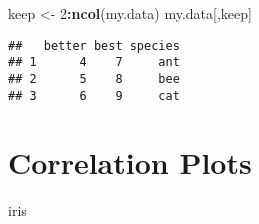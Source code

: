 \documentclass[]{book}
\newenvironment{Shaded}{\begin{snugshade}}{\end{snugshade}}
\newcommand{\DecValTok}[1]{\textcolor[rgb]{0.00,0.00,0.81}{#1}}
\newcommand{\KeywordTok}[1]{\textcolor[rgb]{0.13,0.29,0.53}{\textbf{#1}}}
\newcommand{\NormalTok}[1]{#1}
\newcommand{\OperatorTok}[1]{\textcolor[rgb]{0.81,0.36,0.00}{\textbf{#1}}}
\newcommand{\StringTok}[1]{\textcolor[rgb]{0.31,0.60,0.02}{#1}}
\begin{document}
\begin{Shaded}
\begin{Highlighting}[]
\NormalTok{keep <-}\StringTok{ }\DecValTok{2}\OperatorTok{:}\KeywordTok{ncol}\NormalTok{(my.data)}
\NormalTok{my.data[,keep]}
\end{Highlighting}
\end{Shaded}

\begin{verbatim}
##   better best species
## 1      4    7     ant
## 2      5    8     bee
## 3      6    9     cat
\end{verbatim}

\hypertarget{correlation-plots}{%
\chapter{Correlation Plots}\label{correlation-plots}}

\begin{Shaded}
\begin{Highlighting}[]
\NormalTok{iris}
\end{Highlighting}
\end{Shaded}
\end{document}
